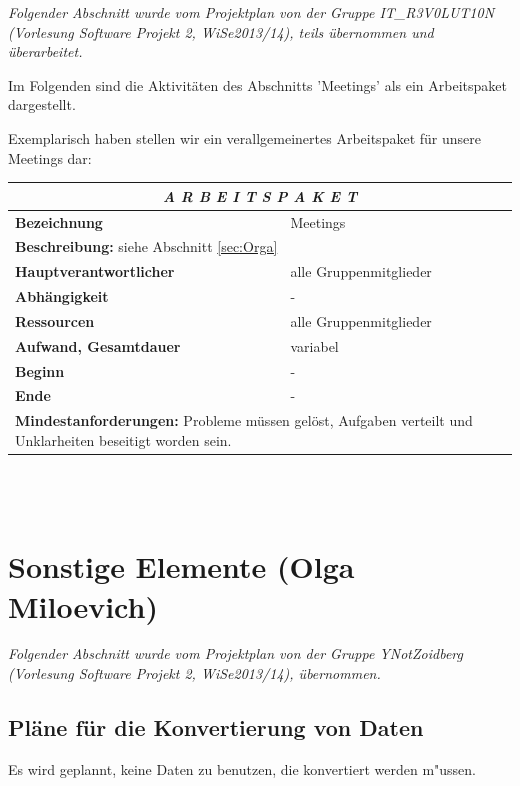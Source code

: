 \documentclass[fontsize=12pt,paper=a4,twoside]{scrartcl}
\begin{document}
\textit{Folgender Abschnitt wurde vom Projektplan von der Gruppe IT\_R3V0LUT10N (Vorlesung Software Projekt 2, WiSe2013/14), teils übernommen und überarbeitet.}

Im Folgenden sind die Aktivitäten des Abschnitts 'Meetings' als ein Arbeitspaket dargestellt. 

Exemplarisch haben stellen wir ein verallgemeinertes Arbeitspaket für unsere Meetings dar: \\

\begin{tabular}{p{7.5cm}|p{7.5cm}}\toprule
\multicolumn{2}{c}{\textbf{\textit{A R B E I T S P A K E T \quad 7}}} \\ \toprule \hline
\textbf{Bezeichnung} & Meetings\\\hline
\multicolumn{2}{p{15cm}}{\textbf{Beschreibung:} \newline 
siehe Abschnitt \ref{sec:Orga}}  \\\hline
\textbf{Hauptverantwortlicher} & alle Gruppenmitglieder\\\hline
\textbf{Abhängigkeit} & -\\\hline
\textbf{Ressourcen} & alle Gruppenmitglieder\\\hline
\textbf{Aufwand, Gesamtdauer} & variabel  \\\hline
\textbf{Beginn} & - \\\hline
\textbf{Ende} & -\\\hline
\multicolumn{2}{p{15cm}}{\textbf{Mindestanforderungen: } Probleme müssen gelöst, Aufgaben verteilt und Unklarheiten beseitigt worden sein.  \newline
}  \\ \toprule
\end{tabular} \\\\ 


\section{Sonstige Elemente (Olga Miloevich)}



\textit{Folgender Abschnitt wurde vom Projektplan von der Gruppe YNotZoidberg (Vorlesung Software Projekt 2, WiSe2013/14), übernommen.}\\

\subsection{Pläne für die Konvertierung von Daten}
Es wird geplannt, keine Daten zu benutzen, die konvertiert werden m"ussen.
\end{document}
